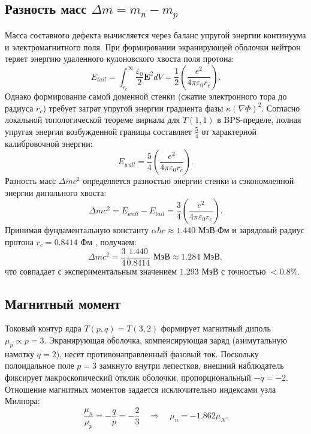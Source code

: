 \documentclass[12pt,a4paper]{article}
\begin{document}
\subsection{Разность масс $\Delta m = m_n - m_p$}
Масса составного дефекта вычисляется через баланс упругой энергии континуума и электромагнитного поля. При формировании экранирующей оболочки нейтрон теряет энергию удаленного кулоновского хвоста поля протона:
\begin{equation}
E_{tail} = \int_{r_c}^{\infty} \frac{\varepsilon_0}{2} \mathbf{E}^2 dV = \frac{1}{2} \left( \frac{e^2}{4\pi\varepsilon_0 r_c} \right).
\end{equation}
Однако формирование самой доменной стенки (сжатие электронного тора до радиуса $r_c$) требует затрат упругой энергии градиента фазы $\kappa(\nabla\Phi)^2$. Согласно локальной топологической теореме вириала для $T(1,1)$ в BPS-пределе, полная упругая энергия возбужденной границы составляет $\frac{5}{4}$ от характерной калибровочной энергии:
\begin{equation}
E_{wall} = \frac{5}{4} \left( \frac{e^2}{4\pi\varepsilon_0 r_c} \right).
\end{equation}
Разность масс $\Delta m c^2$ определяется разностью энергии стенки и сэкономленной энергии дипольного хвоста:
\begin{equation}
\Delta m c^2 = E_{wall} - E_{tail} = \frac{3}{4} \left( \frac{e^2}{4\pi\varepsilon_0 r_c} \right).
\label{eq:deltam}
\end{equation}
Принимая фундаментальную константу $\alpha \hbar c \approx 1.440$ МэВ$\cdot$Фм и зарядовый радиус протона $r_c = 0.8414$ Фм \cite{codata2018}, получаем:
\begin{equation}
\Delta m c^2 = \frac{3}{4} \frac{1.440}{0.8414} \text{ МэВ} \approx 1.284 \text{ МэВ},
\end{equation}
что совпадает с экспериментальным значением $1.293$ МэВ с точностью $<0.8\%$.

\subsection{Магнитный момент}
Токовый контур ядра $T(p,q)=T(3,2)$ формирует магнитный диполь $\mu_p \propto p = 3$. Экранирующая оболочка, компенсирующая заряд (азимутальную намотку $q=2$), несет противонаправленный фазовый ток. Поскольку полоидальное поле $p=3$ замкнуто внутри лепестков, внешний наблюдатель фиксирует макроскопический отклик оболочки, пропорциональный $-q = -2$. Отношение магнитных моментов задается исключительно индексами узла Милнора:
\begin{equation}
\frac{\mu_n}{\mu_p} = -\frac{q}{p} = -\frac{2}{3} \quad \Longrightarrow \quad \mu_n = -1.862 \mu_N.
\end{equation}
\end{document}
